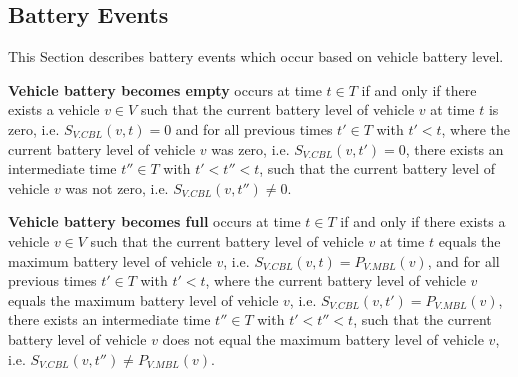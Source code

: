 \documentclass[graybox]{svmult}
\begin{document}
\noindent
\subsection{Battery Events}
\label{sec:battery-events}
This Section describes battery events which occur based on vehicle battery level.
\vspace{4mm}

\noindent
\textbf{Vehicle battery becomes empty}
occurs at time $t \in T$ if and only if there exists a vehicle $v \in V$ such that the current battery level of vehicle $v$ at time $t$ is zero, i.e. $S_{V.CBL}(v,t) = 0$ and for all previous times $t' \in T$ with $t' < t$, where the current battery level of vehicle $v$ was zero, i.e. $S_{V.CBL}(v,t') = 0$, there exists an intermediate time $t'' \in T$ with $t' < t'' < t$, such that the current battery level of vehicle $v$ was not zero, i.e. $S_{V.CBL}(v,t'') \neq 0$.

\vspace{4mm}
\noindent
\textbf{Vehicle battery becomes full}
occurs at time $t \in T$ if and only if there exists a vehicle $v \in V$ such that the current battery level of vehicle $v$ at time $t$ equals the maximum battery level of vehicle $v$, i.e. $S_{V.CBL}(v,t) = P_{V.MBL}(v)$, and for all previous times $t' \in T$ with $t' < t$, where the current battery level of vehicle $v$ equals the maximum battery level of vehicle $v$, i.e. $S_{V.CBL}(v,t') = P_{V.MBL}(v)$, there exists an intermediate time $t'' \in T$ with $t' < t'' < t$, such that the current battery level of vehicle $v$ does not equal the maximum battery level of vehicle $v$, i.e. $S_{V.CBL}(v,t'') \neq P_{V.MBL}(v)$.


\vspace{-2mm}
\end{document}
